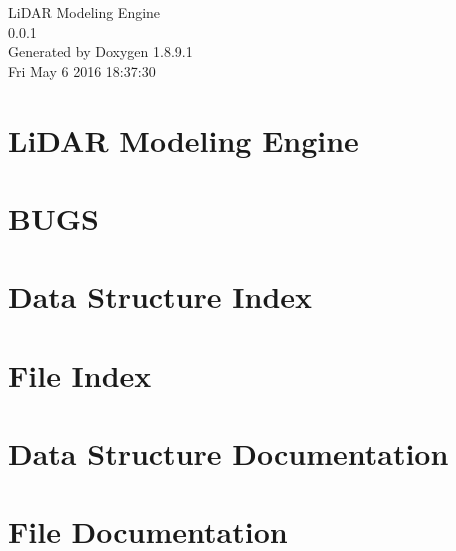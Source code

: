 \documentclass[twoside]{book}
\newcommand{\+}{\discretionary{\mbox{\scriptsize$\hookleftarrow$}}{}{}}
\newcommand{\clearemptydoublepage}{%
  \newpage{\pagestyle{empty}\cleardoublepage}%
}
\begin{document}
\hypersetup{pageanchor=false,
             bookmarks=true,
             bookmarksnumbered=true,
             pdfencoding=unicode
            }
\begin{titlepage}
\vspace*{7cm}
\begin{center}%
{\Large Li\+D\+A\+R Modeling Engine \\[1ex]\large 0.\+0.\+1 }\\
\vspace*{1cm}
{\large Generated by Doxygen 1.8.9.1}\\
\vspace*{0.5cm}
{\small Fri May 6 2016 18:37:30}\\
\end{center}
\end{titlepage}
\clearemptydoublepage
\tableofcontents
\clearemptydoublepage
{}
\hypersetup{pageanchor=true}

\chapter{Li\+D\+A\+R Modeling Engine}
\label{d5/d26/md__home_ncasler_apps_DSME_README}
\hypertarget{d5/d26/md__home_ncasler_apps_DSME_README}{}

\chapter{B\+U\+G\+S}
\label{d4/d48/md__home_ncasler_apps_DSME_TODO}
\hypertarget{d4/d48/md__home_ncasler_apps_DSME_TODO}{}

\chapter{Data Structure Index}

\chapter{File Index}

\chapter{Data Structure Documentation}














\chapter{File Documentation}






\backmatter
\newpage
{}
\clearemptydoublepage
{}
\printindex
\end{document}
